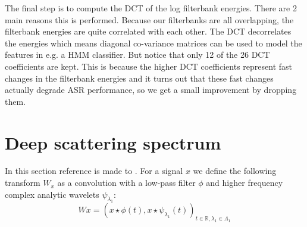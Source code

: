 The final step is to compute the DCT of the log filterbank energies. There are 2 main reasons this is performed. Because our filterbanks are all overlapping, the filterbank energies are quite correlated with each other. The DCT decorrelates the energies which means diagonal co-variance matrices can be used to model the features in e.g. a HMM classifier. But notice that only 12 of the 26 DCT coefficients are kept. This is because the higher DCT coefficients represent fast changes in the filterbank energies and it turns out that these fast changes actually degrade ASR performance, so we get a small improvement by dropping them.

\section{Deep scattering spectrum}
In this section reference is made to \citep{anden2011multiscale, anden2014deep, zeghidour2016deep}. For a signal $x$ we define the following transform $W_x$ as a convolution with a low-pass filter $\phi$ and higher frequency complex analytic wavelets $\psi_{\lambda_1}$:
\begin{equation}
Wx=(x\star\phi(t),x\star\psi_{\lambda_1}(t))_{t\in\mathbb{R},\lambda_1\in\Lambda_1} \label{eqn_c4_dss01}
\end{equation}

